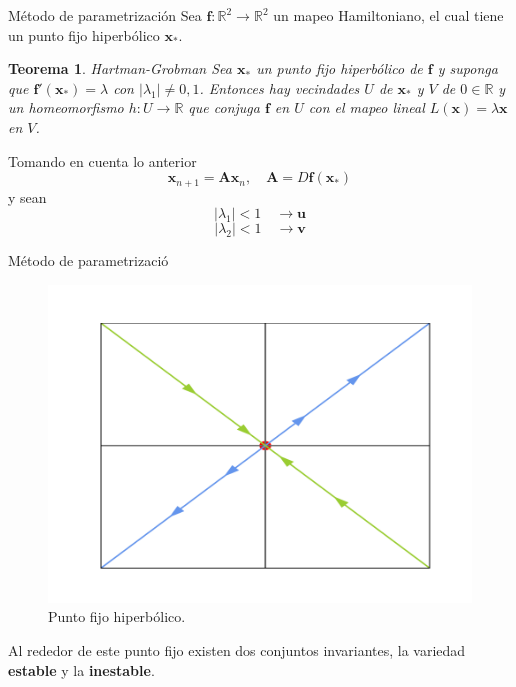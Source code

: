 \documentclass{beamer}		%
\newtheorem{teorema}[theorem]{Teorema}
\begin{document}
\begin{frame}{M\'etodo de parametrizaci\'on}
Sea $\mathbf{f}:\mathbb{R}^{2}\rightarrow\mathbb{R}^{2}$ un mapeo Hamiltoniano, el cual tiene un punto fijo hiperb\'olico $\mathbf{x}_{*}$.\\
\begin{teorema}{Hartman-Grobman}
Sea $\mathbf{x}_{*}$ un punto fijo hiperb\'olico de $\mathbf{f}$ y suponga que $\mathbf{f'}(\mathbf{x_{*}})=\lambda$ con $ \vert \lambda_{1}\vert\neq 0,1 $. Entonces hay vecindades $U$ de $\mathbf{x_{*}}$ y $V$ de $0\in\mathbb{R}$ y un homeomorfismo $h:U\rightarrow\mathbb{R}$ que conjuga $\mathbf{f}$ en $U$ con el mapeo lineal $L(\mathbf{x})=\lambda\mathbf{x}$  en $V$.
\end{teorema}
Tomando en cuenta lo anterior
\begin{equation}
    \mathbf{x}_{n+1} =\mathbf{A}\mathbf{x}_{n}, \quad \mathbf{A}=D\mathbf{f}(\mathbf{x}_{*})
    \label{sistema_lineal}
\end{equation}
y sean \\
\begin{equation}
    \vert \lambda_{1}\vert<1 \quad \rightarrow \mathbf{u}
\label{primer_valorp}
\end{equation}
\begin{equation}
    \vert \lambda_{2}\vert<1 \quad \rightarrow \mathbf{v}
\label{primer_valorp}
\end{equation}

\end{frame}
\begin{frame}{M\'etodo de parametrizaci\'o}
    

\begin{figure}
    \centering
    \includegraphics[scale=0.35]{hyperbolic2.pdf}
    \caption{Punto fijo hiperb\'olico.}
    \label{hiperbolico}
\end{figure}
Al rededor de este punto fijo existen dos conjuntos invariantes, la variedad \textbf{estable} y la \textbf{inestable}.\\

\begin{definition}

\end{definition}

\end{frame}  
\end{document}
